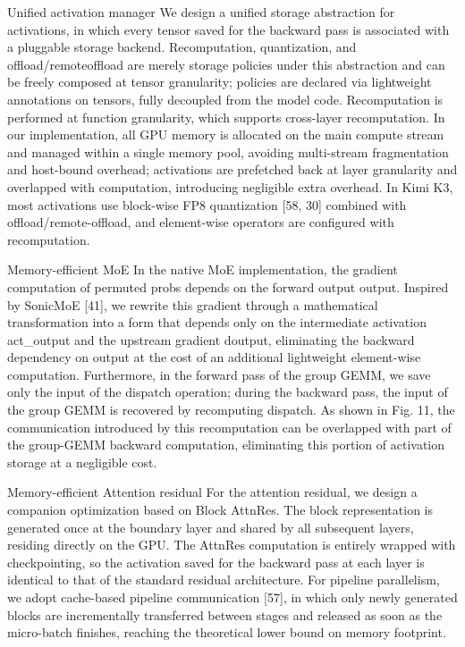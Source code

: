 \documentclass[
  10
]{article}
\begin{document}
Unified activation manager We design a unified storage abstraction for
activations, in which every tensor saved for the backward pass is
associated with a pluggable storage backend. Recomputation,
quantization, and offload/remoteoffload are merely storage policies
under this abstraction and can be freely composed at tensor granularity;
policies are declared via lightweight annotations on tensors, fully
decoupled from the model code. Recomputation is performed at function
granularity, which supports cross-layer recomputation. In our
implementation, all GPU memory is allocated on the main compute stream
and managed within a single memory pool, avoiding multi-stream
fragmentation and host-bound overhead; activations are prefetched back
at layer granularity and overlapped with computation, introducing
negligible extra overhead. In Kimi K3, most activations use block-wise
FP8 quantization {[}58, 30{]} combined with offload/remote-offload, and
element-wise operators are configured with recomputation.

Memory-efficient MoE In the native MoE implementation, the gradient
computation of permuted probs depends on the forward output output.
Inspired by SonicMoE {[}41{]}, we rewrite this gradient through a
mathematical transformation into a form that depends only on the
intermediate activation act\_output and the upstream gradient doutput,
eliminating the backward dependency on output at the cost of an
additional lightweight element-wise computation. Furthermore, in the
forward pass of the group GEMM, we save only the input of the dispatch
operation; during the backward pass, the input of the group GEMM is
recovered by recomputing dispatch. As shown in Fig. 11, the
communication introduced by this recomputation can be overlapped with
part of the group-GEMM backward computation, eliminating this portion of
activation storage at a negligible cost.

Memory-efficient Attention residual For the attention residual, we
design a companion optimization based on Block AttnRes. The block
representation is generated once at the boundary layer and shared by all
subsequent layers, residing directly on the GPU. The AttnRes computation
is entirely wrapped with checkpointing, so the activation saved for the
backward pass at each layer is identical to that of the standard
residual architecture. For pipeline parallelism, we adopt cache-based
pipeline communication {[}57{]}, in which only newly generated blocks
are incrementally transferred between stages and released as soon as the
micro-batch finishes, reaching the theoretical lower bound on memory
footprint.
\end{document}
